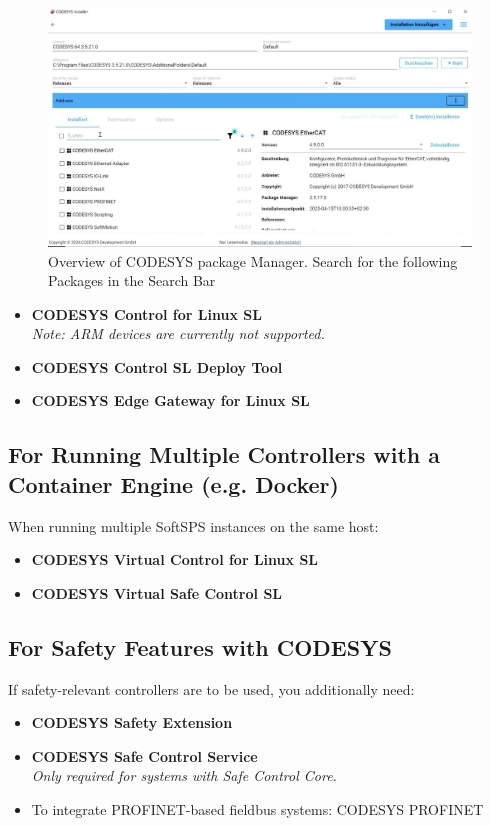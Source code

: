 \documentclass[a4paper,12pt]{article}
\begin{document}
\begin{figure}[H]
	\centering
	\includegraphics[width=1\textwidth]{1.jpg}
	\caption{Overview of CODESYS package Manager. Search for the following Packages in the Search Bar}
	\label{fig:packages-overview}
\end{figure}

\begin{itemize}
	\item \textbf{CODESYS Control for Linux SL} \\
	\textit{Note: ARM devices are currently not supported.}
	\item \textbf{CODESYS Control SL Deploy Tool}
	\item \textbf{CODESYS Edge Gateway for Linux SL}
\end{itemize}



\subsection{For Running Multiple Controllers with a Container Engine (e.g. Docker)}
When running multiple SoftSPS instances on the same host:
\begin{itemize}
	\item \textbf{CODESYS Virtual Control for Linux SL}
	\item \textbf{CODESYS Virtual Safe Control SL}
\end{itemize}

\subsection{For Safety Features with CODESYS}
If safety-relevant controllers are to be used, you additionally need:
\begin{itemize}
	\item \textbf{CODESYS Safety Extension}
	\item \textbf{CODESYS Safe Control Service} \\
	\textit{Only required for systems with Safe Control Core.}
	\item{To integrate PROFINET-based fieldbus systems: CODESYS PROFINET}
\end{itemize}
\end{document}

